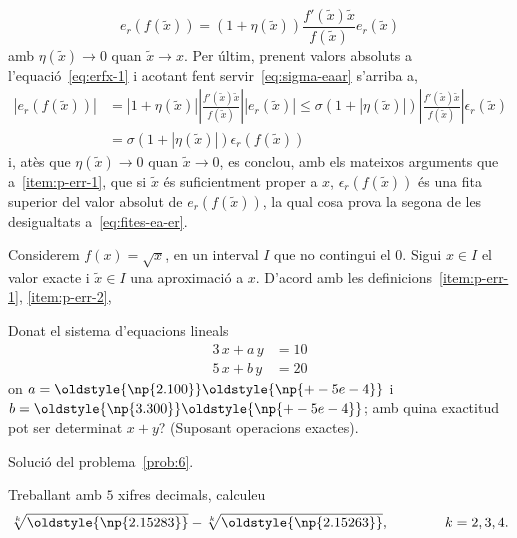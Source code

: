 \documentclass[a4paper,twoside,12pt]{exam}
\newcommand{\osnp}[1]{\oldstyle{\np{#1}}}
\begin{document}
\begin{questions}
\begin{solution}
\begin{enumerate}[label=(\roman*), ref=(\roman*)]
\begin{equation}
  e_{r}\left(f\left(\tilde{x}\right)\right) = \left(1 +
  \eta\left(\tilde{x}\right)\right)\frac{f'\left(\tilde{x}\right)\tilde{x}}
  {f\left(\tilde{x}\right)}e_{r}\left(\tilde{x}\right)
\end{equation}
amb $\eta\left(\tilde{x}\right)\to 0$ quan $\tilde{x}\to x$. Per últim,
prenent valors absoluts a l'equació~\eqref{eq:erfx-1} i acotant fent
servir~\eqref{eq:sigma-eaar} s'arriba a,
\begin{align*}
  \left|e_{r}\left(f\left(\tilde{x}\right)\right)\right| &=
  \left| 1 + \eta\left(\tilde{x}\right) \right|
  \left|\frac{f'\left(\tilde{x}\right)\tilde{x}}
  {f\left(\tilde{x}\right)}\right|\left|e_{r}\left(\tilde{x}\right)\right|
  \le
  \sigma\left( 1 + \left|\eta\left(\tilde{x}\right)\right| \right)
  \left|\frac{f'\left(\tilde{x}\right)\tilde{x}}
  {f\left(\tilde{x}\right)}\right|\epsilon_{r}\left(\tilde{x}\right)\\
  &= \sigma\left(1 + \left|\eta\left(\tilde{x}\right)\right| \right)
  \epsilon_{r}\left(f\left(\tilde{x}\right)\right)
\end{align*}
i, atès que $\eta\left(\tilde{x}\right)\to 0$ quan $\tilde{x}\to 0$, es
conclou, amb els mateixos arguments que a~\ref{item:p-err-1}, que  
si $\tilde{x}$ és suficientment proper a $x$,
$\epsilon_{r}\left(f\left(\tilde{x}\right)\right)$ és una fita 
superior del valor absolut de $e_{r}\left(f\left(\tilde{x}\right)\right)$,
la qual cosa prova la segona de les desigualtats a~\eqref{eq:fites-ea-er}.
\end{enumerate}
Considerem $f(x) = \sqrt{x}$, en un interval $I$ que no contingui el $0$.
Sigui $x\in I$ el valor exacte i $\tilde{x}\in I$ una aproximació a $x$.
D'acord amb les definicions~\ref{item:p-err-1}, \ref{item:p-err-2},
\end{solution}

\question\label{prob:6}
Donat el sistema d'equacions lineals
\begin{align*}
	3\,x + a\,y &= 10\\
	5\,x + b\,y &= 20
\end{align*}
on $a = \osnp{2.100}\osnp{+-5e-4}$ i $b = \osnp{3.300}\osnp{+-5e-4}$; amb 
quina exactitud pot ser determinat $x+y$? (Suposant operacions exactes).
\begin{solution}
	Solució del problema~\ref{prob:6}.
\end{solution}

\question\label{prob:7}
Treballant amb $5$ xifres decimals, calculeu
\begin{displaymath}
	\sqrt[k]{\osnp{2.15283}} - \sqrt[k]{\osnp{2.15263}},\qquad\qquad
	k=2,3,4.
\end{displaymath}
\begin{parts}

\end{parts}
\end{questions}
\end{document}
